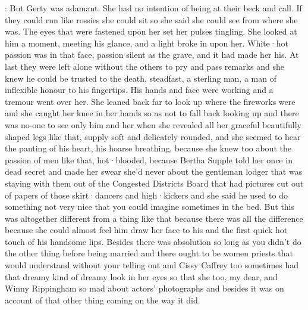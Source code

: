 :
But Gerty was adamant.
She had no intention
of being at their beck and call.
If they could run like rossies
she could sit
so she said she could see
from where she was.
The eyes that were fastened upon her
set her pulses tingling.
She looked at him a moment,
meeting his glance,
and a light broke in upon her.
White·hot passion was in that face,
passion silent as the grave,
and it had made her
his.
At last
they were left alone
without the others to pry and pass remarks
and she knew
he could be trusted to the death,
steadfast,
a sterling man,
a man of inflexible honour
to his fingertips.
His hands and face were working
and a tremour went over her.
She leaned back far
to look up
where the fireworks were
and she caught her knee in her hands
so as not to fall back looking up
and there was no-one to see
only him
and her
when she revealed
all her graceful beautifully shaped legs like that,
supply soft and delicately rounded,
and she seemed to hear
the panting of his heart,
his hoarse breathing,
because she knew too
about the passion of men like that,
hot·blooded,
because Bertha Supple told her once
in dead secret
and made her swear
she'd never about the gentleman lodger
that was staying with them
out of the Congested Districts Board
that had pictures cut out of papers
of those skirt·dancers and high·kickers
and she said
he used to do something not very nice
that you could imagine sometimes
in the bed.
But this was altogether different
from a thing like that
because there was all the difference
because she could almost feel him
draw her face to his
and the first quick hot touch
of his handsome lips.
Besides there was absolution
so long as you didn't
do the other thing before being married
and there ought to be women priests
that would understand
without your telling out
and Cissy Caffrey too
sometimes had that dreamy kind of dreamy look
in her eyes
so that she too,
my dear,
and Winny Rippingham
so mad about actors' photographs
and besides
it was on account
of that other thing coming on
the way it did.

